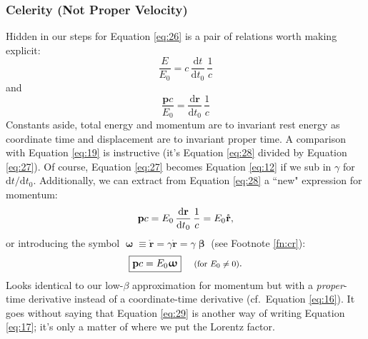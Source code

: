 \documentclass[12pt]{article}
\renewcommand{\vv}[1]{\mathbf{#1}}
\newcommand{\dd}[1]{\mathrm{d}#1}
\newcommand{\vvbeta}{\bm{\upbeta}}
\newcommand{\vvomega}{\bm{\upomega}}
\begin{document}
\subsubsection{Celerity (Not Proper Velocity)}\label{sssec:ce}

Hidden in our steps for Equation \ref{eq:26} is a pair of relations worth making explicit:
\begin{equation}\label{eq:27}
\dfrac{E}{E_0} = c \, \dfrac{\dd t}{\dd t_0} \, \dfrac{1}{c}
\end{equation}
and
\begin{equation}\label{eq:28}
\dfrac{\vv p c}{E_0} = \dfrac{\dd \vv r}{\dd t_0} \, \dfrac{1}{c}
\end{equation}
Constants aside, total energy and momentum are to invariant rest energy as coordinate time and displacement are to invariant proper time. A comparison with Equation \ref{eq:19} is instructive (it's Equation \ref{eq:28} divided by Equation \ref{eq:27}). Of course, Equation \ref{eq:27} becomes Equation \ref{eq:12} if we sub in $\gamma$ for $\dd t / \dd t_0$. Additionally, we can extract from Equation \ref{eq:28} a ``new" expression for momentum:
\begin{equation*}
\vv p c = E_0 \, \dfrac{\dd \vv r}{\dd t_0} \, \dfrac{1}{c} = E_0 \mkern.5mu \mathring{\vv r},
\end{equation*}
or introducing the symbol $\vvomega \equiv \mathring{\vv r} = \gamma \dot{\vv r} = \gamma \vvbeta$ (see Footnote \ref{fn:cr}):
\begin{equation}\label{eq:29}
\boxed{\vv p c = E_0 \vvomega} \quad \textrm{\footnotesize{ (for $E_0 \neq 0$)}}.
\end{equation}
Looks identical to our low-$\beta$ approximation for momentum but with a \emph{proper}-time derivative instead of a coordinate-time derivative (cf.\ Equation \ref{eq:16}). It goes without saying that Equation \ref{eq:29} is another way of writing Equation \ref{eq:17}; it's only a matter of where we put the Lorentz factor.
\end{document}
